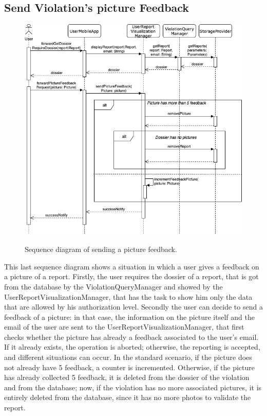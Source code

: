 \documentclass[../RASD.tex]{subfiles}
\begin{document}
    \subsection{Send Violation's picture Feedback}\label{subsec:send-violation's-picture-feedback}
    \begin{figure}[H]
        \centering
        \includegraphics[scale = 2]{assets/sequence_diagrams/sendFeedback.png}\\
        \caption[\textit{Sequence} Diagram (\textit{Send feedback to picture})]{Sequence diagram of sending a picture feedback.}
    \end{figure}
    This last sequence diagram shows a situation in which a user gives a feedback on a picture of a report.
    Firstly, the user requires the dossier of a report, that is got from the database by the ViolationQueryManager and showed by the UserReportVisualizationManager,
    that has the task to show him only the data that are allowed by his authorization level.
    Secondly the user can decide to send a feedback of a picture: in that case, the information on the picture itself and the email of the user
    are sent to the UserReportVisualizationManager, that first checks whether the picture has already a feedback associated to the user’s email.
    If it already exists, the operation is aborted;
    otherwise, the reporting is accepted, and different situations can occur.
    In the standard scenario, if the picture does not already have 5 feedback, a counter is incremented.
    Otherwise, if the picture has already collected 5 feedback, it is deleted from the dossier of the violation and from the database;
    now, if the violation has no more associated pictures, it is entirely deleted from the database, since it has no more photos to validate the report.
    \newpage
\end{document}
